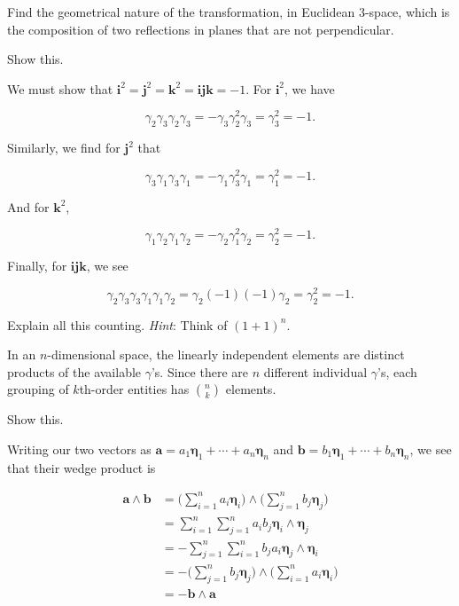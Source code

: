 \documentclass[../the-road-to-reality.tex]{subfiles}
\begin{document}
\begin{questions}
\question Find the geometrical nature of the transformation, in Euclidean 3-space, which is the composition of two reflections in planes that are not perpendicular.

\question Show this.

\begin{solution}
        We must show that $\mathbf{i}^2 = \mathbf{j}^2 = \mathbf{k}^2 = \mathbf{ijk} = -1$. For $\mathbf{i}^2$, we have

\[
        \gamma_2\gamma_3\gamma_2\gamma_3 = -\gamma_3\gamma_2^2\gamma_3 = \gamma_3^2 = -1
.\] 

        Similarly, we find for $\mathbf{j}^2$ that

\[
        \gamma_3\gamma_1\gamma_3\gamma_1 = -\gamma_1\gamma_3^2\gamma_1 = \gamma_1^2 = -1
.\] 

        And for $\mathbf{k}^2$,

\[
        \gamma_1\gamma_2\gamma_1\gamma_2 = -\gamma_2\gamma_1^2\gamma_2 = \gamma_2^2 = -1
.\] 

        Finally, for $\mathbf{ijk}$, we see

	\[
        \gamma_2\gamma_3\gamma_3\gamma_1\gamma_1\gamma_2 = \gamma_2(-1)(-1)\gamma_2 = \gamma_2^2 = -1
	.\] 
\end{solution}	

\question Explain all this counting. \textit{Hint}: Think of $(1 + 1)^n$.

\begin{solution}
        In an $n$-dimensional space, the linearly independent elements are distinct products of the available $\gamma$'s. Since there are $n$ different individual $\gamma$'s, each grouping of $k$th-order entities has ${n\choose{k}}$ elements.
\end{solution}	

\question Show this.

\begin{solution}
        Writing our two vectors as $\mathbf{a} = a_1\mathbf{\eta}_1 + \cdots + a_n\mathbf{\eta}_n$ and $\mathbf{b} = b_1\mathbf{\eta}_1 + \cdots + b_n\mathbf{\eta}_n$, we see that their wedge product is

        \begin{align*}
                \mathbf{a} \wedge \mathbf{b} &= \Big(\sum_{i=1}^na_i\mathbf{\eta}_i\Big) \wedge \Big(\sum_{j=1}^nb_j\mathbf{\eta}_j\Big) \\
                &= \sum_{i=1}^n\sum_{j=1}^na_ib_j\mathbf{\eta}_i\wedge\mathbf{\eta}_j \\
                &= -\sum_{j=1}^n\sum_{i=1}^nb_ja_i\mathbf{\eta}_j\wedge\mathbf{\eta}_i \\
                &= -\Big(\sum_{j=1}^nb_j\mathbf{\eta}_j\Big)\wedge\Big(\sum_{i=1}^na_i\mathbf{\eta}_i\Big) \\
                &= -\mathbf{b}\wedge\mathbf{a}
        \end{align*}
\end{solution}	


\end{questions}
\end{document}

